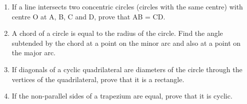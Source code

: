 \begin{enumerate}[label=\thesubsection.\arabic*,ref=\thesubsection.\theenumi]
\item If a line intersects two concentric circles (circles with the same centre) with centre O at A, B, C and D, prove that AB = CD.

\item A chord of a circle is equal to the radius of the
circle. Find the angle subtended by the chord at
a point on the minor arc and also at a point on the
major arc.
\item If diagonals of a cyclic quadrilateral are diameters of the circle through the vertices of
the quadrilateral, prove that it is a rectangle.
\item If the non-parallel sides of a trapezium are equal, prove that it is cyclic.

\end{enumerate}
